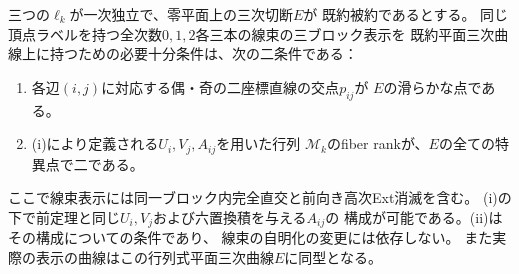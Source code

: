 \begin{theorem}[既約行列式平面に対する曲線表示の判定]
\label{thm:ou-integral-determinant-criterion}
三つの$\ell_k$が一次独立で、零平面上の三次切断$E$が
既約被約であるとする。
同じ頂点ラベルを持つ全次数$0,1,2$各三本の線束の三ブロック表示を
既約平面三次曲線上に持つための必要十分条件は、次の二条件である：
\begin{enumerate}[label=(\roman*)]
\item 各辺$(i,j)$に対応する偶・奇の二座標直線の交点$p_{ij}$が
      $E$の滑らかな点である。
\item (i)により定義される$U_i,V_j,A_{ij}$を用いた行列
      $\mathscr M_k$のfiber rankが、$E$の全ての特異点で二である。
\end{enumerate}
ここで線束表示には同一ブロック内完全直交と前向き高次Ext消滅を含む。
(i)の下で前定理と同じ$U_i,V_j$および六置換積を与える$A_{ij}$の
構成が可能である。(ii)はその構成についての条件であり、
線束の自明化の変更には依存しない。
また実際の表示の曲線はこの行列式平面三次曲線$E$に同型となる。
\end{theorem}
